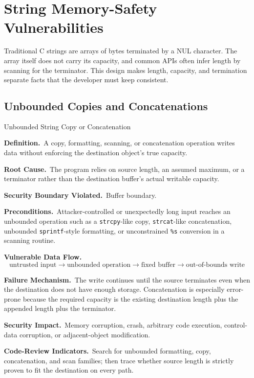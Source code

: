 \documentclass[11pt]{article}
\newcommand{\field}[1]{\par\smallskip\noindent\textbf{#1.}\ }
\begin{document}
\section{String Memory-Safety Vulnerabilities}

Traditional C strings are arrays of bytes terminated by a NUL character. The array itself does not carry its capacity, and common APIs often infer length by scanning for the terminator. This design makes length, capacity, and termination separate facts that the developer must keep consistent.

\subsection{Unbounded Copies and Concatenations}

\begin{catalogbox}{Unbounded String Copy or Concatenation}
\field{Definition}A copy, formatting, scanning, or concatenation operation writes data without enforcing the destination object's true capacity.

\field{Root Cause}The program relies on source length, an assumed maximum, or a terminator rather than the destination buffer's actual writable capacity.

\field{Security Boundary Violated}Buffer boundary.

\field{Preconditions}Attacker-controlled or unexpectedly long input reaches an unbounded operation such as a \texttt{strcpy}-like copy, \texttt{strcat}-like concatenation, unbounded \texttt{sprintf}-style formatting, or unconstrained \texttt{\%s} conversion in a scanning routine.

\field{Vulnerable Data Flow}
\[
\text{untrusted input} \rightarrow \text{unbounded operation} \rightarrow
\text{fixed buffer} \rightarrow \text{out-of-bounds write}
\]

\field{Failure Mechanism}The write continues until the source terminates even when the destination does not have enough storage. Concatenation is especially error-prone because the required capacity is the existing destination length plus the appended length plus the terminator.

\field{Security Impact}Memory corruption, crash, arbitrary code execution, control-data corruption, or adjacent-object modification.

\field{Code-Review Indicators}Search for unbounded formatting, copy, concatenation, and scan families; then trace whether source length is strictly proven to fit the destination on every path.


\end{catalogbox}
\end{document}

